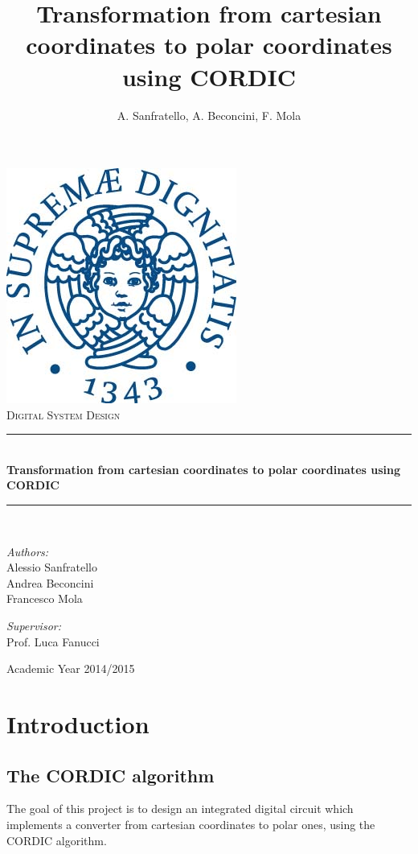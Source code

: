 \documentclass[12pt,a4paper]{report}
\author{A. Sanfratello, A. Beconcini, F. Mola}
\title{Transformation from cartesian coordinates to polar coordinates using CORDIC}
\newcommand{\HRule}{\rule{\linewidth}{0.5mm}}
\begin{document}
\begin{titlepage}
\begin{center}
	\includegraphics[scale=.60]{img/Unipi_logo.jpg}\\[3cm]
	\textsc{\Large Digital System Design}
	\HRule \\[0.4cm]
{ \huge \bfseries Transformation from cartesian coordinates to polar coordinates using CORDIC \\[0.4cm] }
	\HRule \\[4cm]
	\noindent
	\begin{minipage}{0.4\textwidth}
	\begin{flushleft} \large
	\emph{Authors:}\\
	Alessio Sanfratello\\
	Andrea Beconcini\\
	Francesco Mola 
	\end{flushleft}
	\end{minipage}%
	\begin{minipage}{0.4\textwidth}
	\begin{flushright} \large
	\emph{Supervisor:} \\
	Prof. Luca Fanucci
	\end{flushright}
	\end{minipage}

	\vfill
	{\large Academic Year 2014/2015}
\end{center}
\end{titlepage}

\tableofcontents


\chapter{Introduction}

\section{The CORDIC algorithm}
\label{sec:cordic_alghorithm}
The goal of this project is to design an integrated digital circuit which implements a converter from cartesian coordinates to polar ones, using the CORDIC algorithm.
\end{document}
